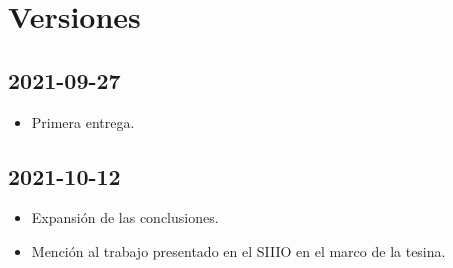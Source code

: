 \documentclass{article}
\begin{document}
\section*{Versiones}

\subsection*{2021-09-27}
\begin{itemize}
    \item Primera entrega.
\end{itemize}


\subsection*{2021-10-12}
\begin{itemize}
    \item Expansión de las conclusiones.
    \item Mención al trabajo presentado en el SIIIO en el marco de la tesina.
\end{itemize}
\end{document}
